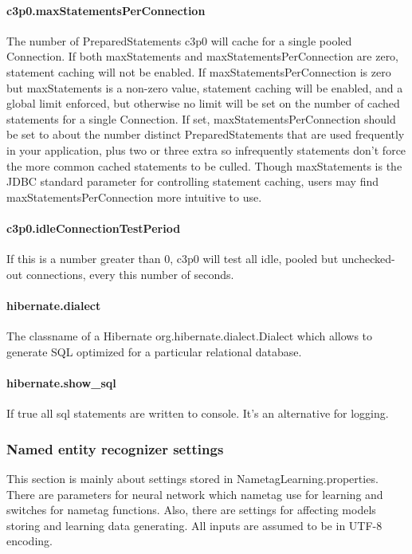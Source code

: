 \documentclass[12pt,a4paper]{report}
\begin{document}
\paragraph{c3p0.maxStatementsPerConnection}
The number of PreparedStatements c3p0 will cache for a single pooled Connection. If both maxStatements and maxStatementsPerConnection are zero, statement caching will not be enabled. If maxStatementsPerConnection is zero but maxStatements is a non-zero value, statement caching will be enabled, and a global limit enforced, but otherwise no limit will be set on the number of cached statements for a single Connection. If set, maxStatementsPerConnection should be set to about the number distinct PreparedStatements that are used frequently in your application, plus two or three extra so infrequently statements don't force the more common cached statements to be culled. Though maxStatements is the JDBC standard parameter for controlling statement caching, users may find maxStatementsPerConnection more intuitive to use.

\paragraph{c3p0.idleConnectionTestPeriod}
If this is a number greater than 0, c3p0 will test all idle, pooled but unchecked-out connections, every this number of seconds.

\paragraph{hibernate.dialect}
The classname of a Hibernate org.hibernate.dialect.Dialect which allows to generate SQL optimized for a particular relational database.
\paragraph{hibernate.show\_sql}
If true all sql statements are written to console. It's an alternative for logging.

\subsubsection{Named entity recognizer settings}
This section is mainly about settings stored in NametagLearning.properties.
There are parameters for neural network which nametag use for learning and switches for nametag functions.
Also, there are settings for affecting models storing and learning data generating.
All inputs are assumed to be in UTF-8 encoding.
\end{document}

